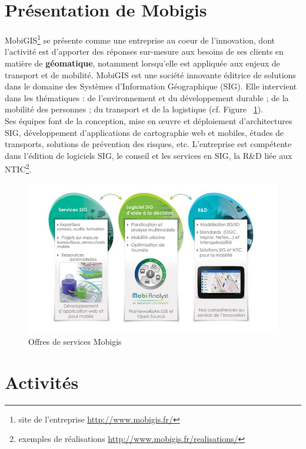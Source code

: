 \section{Présentation de Mobigis}

MobiGIS\footnote{site de l’entreprise \url{http://www.mobigis.fr/}} se présente comme une entreprise au coeur de l’innovation, dont l’activité est d’apporter des réponses sur-mesure aux besoins de ses clients en matière de \textbf{géomatique}, notamment lorsqu’elle est appliquée aux enjeux de transport et de mobilité. MobiGIS est une société innovante éditrice de solutions dans le domaine des Systèmes d’Information Géographique (SIG). 
Elle intervient dans les thématiques : de l’environnement et du développement durable ; de la mobilité des personnes ; du transport et de la logistique (cf. Figure ~\ref{fig:fig1}).\\

Ses équipes font de la conception, mise en \oe uvre et déploiement d'architectures SIG, développement d’applications de cartographie web et mobiles, études de transports, solutions de prévention des risques, etc. L’entreprise est compétente dans l’édition de logiciels SIG, le conseil et les services en SIG, la R\&D liée aux NTIC\footnote{exemples de réalisations \url{http://www.mobigis.fr/realisations/}}.\\

\begin{figure}[!h]\label{fig:fig1}
\centering
\includegraphics[width=12cm]{images/fig1_solutionsMobigis.JPG}
\caption{Offres de services Mobigis}
\end{figure} 

\pagebreak

\section{Activités}

